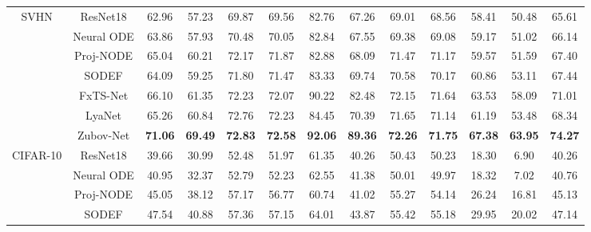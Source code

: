 \documentclass[journal]{IEEEtran}
\begin{document}
\begin{table}[ht]
\begin{tabular}{ccccccccccccc}
		\multirow{6}{*}{SVHN} & ResNet18             & 62.96           & 57.23           & 69.87           & 69.56          & 82.76           & 67.26          & 69.01           & 68.56           & 58.41            & 50.48            & 65.61  \\
		& Neural ODE           & 63.86           & 57.93           & 70.48           & 70.05          & 82.84           & 67.55          & 69.38           & 69.08           & 59.17            & 51.02            & 66.14                \\
		& Proj-NODE			   & 65.04 			 & 60.21 	       & 72.17  	     & 71.87  	      & 82.88 	        & 68.09 	     & 71.47 	       & 71.17 	         & 59.57 	        & 51.59 	       & 67.40 \\
		& SODEF                & 64.09           & 59.25           & 71.80           & 71.47          & 83.33           & 69.74          & 70.58           & 70.17           & 60.86            & 53.11            & 67.44                \\
		& FxTS-Net             & 66.10           & 61.35           & 72.23           & 72.07          & 90.22           & 82.48          & 72.15           & 71.64           & 63.53            & 58.09            & 71.01                \\
		& LyaNet               & 65.26           & 60.84           & 72.76           & 72.23          & 84.45           & 70.39          & 71.65           & 71.14           & 61.19            & 53.48            & 68.34                \\
		& Zubov-Net            & \textbf{71.06}  & \textbf{69.49}  & \textbf{72.83}  & \textbf{72.58} & \textbf{92.06}  & \textbf{89.36} & \textbf{72.26}  & \textbf{71.75}  & \textbf{67.38}   & \textbf{63.95}   & \textbf{74.27}       \\ \midrule
		\multirow{6}{*}{CIFAR-10} & ResNet18             & 39.66          & 30.99          & 52.48          & 51.97          & 61.35          & 40.26          & 50.43          & 50.23          & 18.30          & 6.90           & 40.26    \\
		& Neural ODE           & 40.95          & 32.37          & 52.79          & 52.23          & 62.55          & 41.38          & 50.01          & 49.97          & 18.32          & 7.02           & 40.76           \\
		& Proj-NODE  		   & 45.05 			& 38.12 		 & 57.17 		  & 56.77 		   & 60.74 			& 41.02 		 & 55.27 		  & 54.14 		   & 26.24 			& 16.81 		 & 45.13          \\
		& SODEF                & 47.54          & 40.88          & 57.36          & 57.15          & 64.01          & 43.87          & 55.42          & 55.18          & 29.95          & 20.02          & 47.14            \\

\end{tabular}
\end{table}
\end{document}
